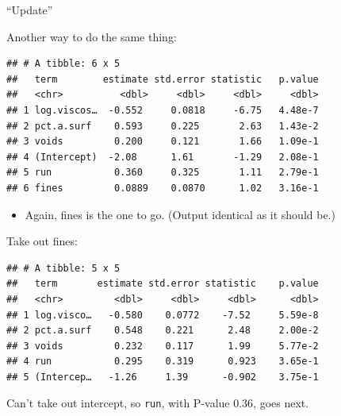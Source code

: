 \documentclass[ignorenonframetext,]{beamer}
\newenvironment{Shaded}{\begin{snugshade}}{\end{snugshade}}
\newcommand{\FloatTok}[1]{\textcolor[rgb]{0.00,0.00,0.81}{#1}}
\newcommand{\KeywordTok}[1]{\textcolor[rgb]{0.13,0.29,0.53}{\textbf{#1}}}
\newcommand{\NormalTok}[1]{#1}
\newcommand{\OperatorTok}[1]{\textcolor[rgb]{0.81,0.36,0.00}{\textbf{#1}}}
\newcommand{\StringTok}[1]{\textcolor[rgb]{0.31,0.60,0.02}{#1}}
\providecommand{\tightlist}{%
  \setlength{\itemsep}{0pt}\setlength{\parskip}{0pt}}
\begin{document}
\begin{frame}[fragile]{``Update''}
\protect\hypertarget{update}{}

Another way to do the same thing:

\begin{Shaded}
\end{Shaded}

\begin{verbatim}
## # A tibble: 6 x 5
##   term        estimate std.error statistic   p.value
##   <chr>          <dbl>     <dbl>     <dbl>     <dbl>
## 1 log.viscos…  -0.552     0.0818     -6.75   4.48e-7
## 2 pct.a.surf    0.593     0.225       2.63   1.43e-2
## 3 voids         0.200     0.121       1.66   1.09e-1
## 4 (Intercept)  -2.08      1.61       -1.29   2.08e-1
## 5 run           0.360     0.325       1.11   2.79e-1
## 6 fines         0.0889    0.0870      1.02   3.16e-1
\end{verbatim}

\begin{itemize}
\tightlist
\item
  Again, fines is the one to go. (Output identical as it should be.)
\end{itemize}

\end{frame}

\begin{frame}[fragile]{Take out fines:}
\protect\hypertarget{take-out-fines}{}

\begin{Shaded}
\end{Shaded}

\begin{verbatim}
## # A tibble: 5 x 5
##   term       estimate std.error statistic    p.value
##   <chr>         <dbl>     <dbl>     <dbl>      <dbl>
## 1 log.visco…   -0.580    0.0772    -7.52     5.59e-8
## 2 pct.a.surf    0.548    0.221      2.48     2.00e-2
## 3 voids         0.232    0.117      1.99     5.77e-2
## 4 run           0.295    0.319      0.923    3.65e-1
## 5 (Intercep…   -1.26     1.39      -0.902    3.75e-1
\end{verbatim}

Can't take out intercept, so \texttt{run}, with P-value 0.36, goes next.

\end{frame}
\end{document}
